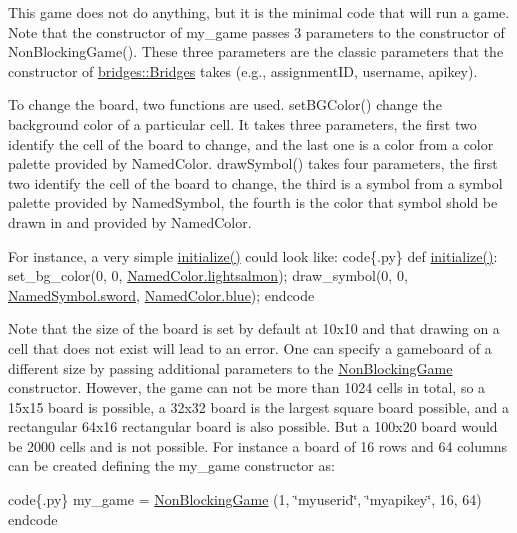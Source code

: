 This game does not do anything, but it is the minimal code that will run a game. Note that the constructor of my\+\_\+game passes 3 parameters to the constructor of Non\+Blocking\+Game(). These three parameters are the classic parameters that the constructor of \mbox{\hyperlink{classbridges_1_1bridges_1_1_bridges}{bridges\+::\+Bridges}} takes (e.\+g., assignment\+ID, username, apikey).

To change the board, two functions are used. set\+B\+G\+Color() change the background color of a particular cell. It takes three parameters, the first two identify the cell of the board to change, and the last one is a color from a color palette provided by Named\+Color. draw\+Symbol() takes four parameters, the first two identify the cell of the board to change, the third is a symbol from a symbol palette provided by Named\+Symbol, the fourth is the color that symbol shold be drawn in and provided by Named\+Color.

For instance, a very simple \mbox{\hyperlink{classbridges_1_1gamebase_1_1_game_base_a336629d190f1601f1211ca57e4d5427d}{initialize()}} could look like\+: code\{.py\} def \mbox{\hyperlink{classbridges_1_1gamebase_1_1_game_base_a336629d190f1601f1211ca57e4d5427d}{initialize()}}\+: set\+\_\+bg\+\_\+color(0, 0, \mbox{\hyperlink{classbridges_1_1named__color_1_1_named_color_a616e82749b8c7711ede2554ce8e3a879}{Named\+Color.\+lightsalmon}}); draw\+\_\+symbol(0, 0, \mbox{\hyperlink{classbridges_1_1named__symbol_1_1_named_symbol_a02fc79c7bdc9a95febfbcb22ac7079d2}{Named\+Symbol.\+sword}}, \mbox{\hyperlink{classbridges_1_1named__color_1_1_named_color_a145708a26f3f348fb34085de800c6e67}{Named\+Color.\+blue}}); endcode

Note that the size of the board is set by default at 10x10 and that drawing on a cell that does not exist will lead to an error. One can specify a gameboard of a different size by passing additional parameters to the \mbox{\hyperlink{classbridges_1_1non__blocking__game_1_1_non_blocking_game}{Non\+Blocking\+Game}} constructor. However, the game can not be more than 1024 cells in total, so a 15x15 board is possible, a 32x32 board is the largest square board possible, and a rectangular 64x16 rectangular board is also possible. But a 100x20 board would be 2000 cells and is not possible. For instance a board of 16 rows and 64 columns can be created defining the my\+\_\+game constructor as\+:

code\{.py\} my\+\_\+game = \mbox{\hyperlink{classbridges_1_1non__blocking__game_1_1_non_blocking_game}{Non\+Blocking\+Game}} (1, \char`\"{}myuserid\char`\"{}, \char`\"{}myapikey\char`\"{}, 16, 64) endcode

